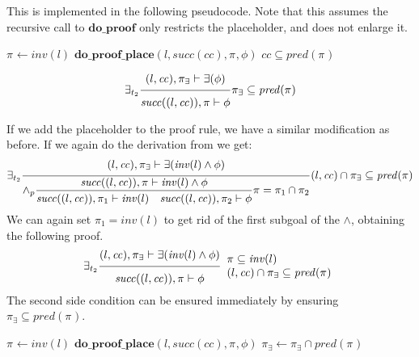 \documentclass{article}
\newcommand{\proofrule}[3][]{#1 \frac{\raisebox{.7ex}{\normalsize{$#2$}}}
  {\raisebox{-1.0ex}{\normalsize{$#3$}}}}
\newcommand{\placeholder}[1][]{\pi_{#1}}
\newcommand{\loc}{l}
\newcommand{\region}{\mathit{cc}}
\newcommand{\suc}{\mathit{succ}}
\newcommand{\pre}{\mathit{pred}}
\newcommand{\inv}{\mathit{inv}}
\newcommand{\method}[1]{\ensuremath{\mathbf{#1}}}
\begin{document}
This is implemented in the following pseudocode. Note that this assumes the recursive
call to \method{do\_proof} only restricts the placeholder, and does not enlarge it.

\begin{algorithm}[H]
\caption{$\method{do\_proof\_exists}(\loc, \region, \exists(\phi))$}
\begin{algorithmic}
\STATE $\placeholder \gets \inv(\loc)$ 
\STATE $\method{do\_proof\_place}(\loc, \suc(\region), \placeholder, \phi)$
\RETURN $\region \subseteq \pre(\placeholder)$
\end{algorithmic}
\end{algorithm}

\[
%
\proofrule[\exists_{t_2}]
{(\loc, \region), \placeholder[\exists] \vdash \exists(\phi)}
{\suc((\loc, \region)), \placeholder \vdash \phi}
\placeholder[\exists] \subseteq \pre(\placeholder)
\]

If we add the placeholder to the proof rule, we have a similar modification as
before. If we again do the derivation from \cite[Appendix C.2]{FC:14report} we get:
\[
\proofrule[\exists_{t_2}]
{(\loc, \region), \placeholder[\exists] \vdash \exists(\inv(\loc) \land \phi)}
{\proofrule[\land_p]
  {\suc((\loc, \region)), \placeholder \vdash \inv(\loc) \land \phi}
  {\suc((\loc, \region)), \placeholder[1] \vdash \inv(\loc)
   \quad \suc((\loc, \region)), \placeholder[2] \vdash \phi}
  \placeholder = \placeholder[1] \cap \placeholder[2]
}
(\loc, \region) \cap \placeholder[\exists] \subseteq \pre(\placeholder)
\]
We can again set $\placeholder[1] = \inv(\loc)$ to get rid of the first subgoal of the $\land$,
obtaining the following proof.
\[
\proofrule[\exists_{t_2}]
{(\loc, \region), \placeholder[\exists] \vdash \exists(\inv(\loc) \land \phi)}
{\suc((\loc, \region)), \placeholder \vdash \phi}
\begin{array}{l}
\placeholder \subseteq \inv(l)\\
(\loc, \region) \cap \placeholder[\exists] \subseteq \pre(\placeholder)
\end{array}
\]
The second side condition can be ensured immediately by ensuring $\placeholder[\exists] \subseteq \pre(\placeholder)$.

\begin{algorithm}[H]
\caption{$\method{do\_proof\_exists\_place}(\loc, \region, \placeholder[\exists], \exists(\phi))$}
\begin{algorithmic}
\STATE $\placeholder \gets \inv(\loc)$ 
\STATE $\method{do\_proof\_place}(\loc, \suc(\region), \placeholder, \phi)$
\STATE $\placeholder[\exists] \gets \placeholder[\exists] \cap \pre(\placeholder)$
\end{algorithmic}
\end{algorithm}
\end{document}
